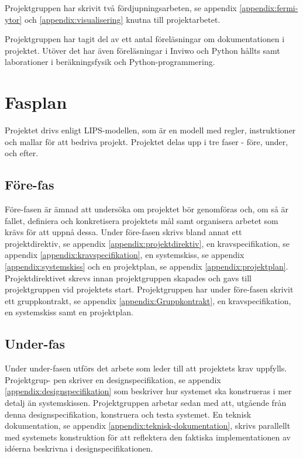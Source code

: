 \documentclass[a4paper,12pt]{article}
\begin{document}
Projektgruppen har skrivit två fördjupningsarbeten, se appendix \ref{appendix:fermi-ytor} och \ref{appendix:visualisering} knutna till projektarbetet.

Projektgruppen har tagit del av ett antal föreläsningar om dokumentationen i projektet. Utöver det har även föreläsningar i Inviwo och Python hållts samt laborationer i beräkningsfysik och Python-programmering. 

\section{Fasplan}
\label{ch:fasplan}
Projektet drivs enligt LIPS-modellen, som är en modell med regler, instruktioner och mallar för att bedriva projekt. Projektet delas upp i tre faser - före, under, och efter.

\subsection{Före-fas}
Före-fasen är ämnad att undersöka om projektet bör genomföras och, om så är fallet, definiera och konkretisera projektets mål samt organisera arbetet som krävs för att uppnå dessa. Under före-fasen skrivs bland annat ett projektdirektiv, se appendix \ref{appendix:projektdirektiv}, en kravspecifikation, se appendix \ref{appendix:kravspecifikation}, en systemskiss, se appendix \ref{appendix:systemskiss} och en projektplan, se appendix \ref{appendix:projektplan}. Projektdirektivet skrevs innan projektgruppen skapades och gavs till projektgruppen vid projektets start.
Projektgruppen har under före-fasen skrivit ett gruppkontrakt, se appendix \ref{appendix:Gruppkontrakt}, en kravspecifikation, en systemskiss samt en projektplan.

\subsection{Under-fas}
Under  under-fasen  utförs  det  arbete  som  leder  till  att  projektets  krav  uppfylls.  Projektgrup-
pen skriver en designspecifikation, se appendix \ref{appendix:designspecifikation}
som beskriver hur systemet ska konstrueras i mer detalj än
systemskissen. Projektgruppen arbetar sedan med att, utgående från denna designspecifikation, konstruera och testa systemet. En teknisk dokumentation, se appendix \ref{appendix:teknisk-dokumentation}, skrivs parallellt med systemets konstruktion för att reflektera den faktiska implementationen av idéerna beskrivna i designspecifikationen. 
\end{document}
